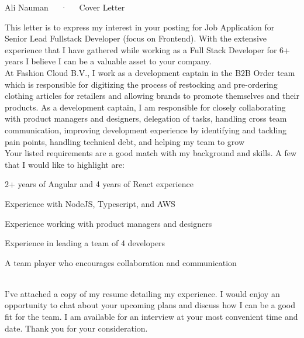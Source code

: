 \documentclass[11pt, a4paper]{awesome-cv}
\begin{document}
\makecvheader[L]

\makecvfooter
  {}
  {Ali Nauman~~~·~~~Cover Letter}
  {}

\makelettertitle

\begin{cvletter}


This letter is to express my interest in your posting for Job Application for Senior Lead Fullstack Developer (focus on Frontend). With the extensive experience that I have gathered while working as a Full Stack Developer for 6+ years I believe I can be a valuable asset to your company.\\

At Fashion Cloud B.V., I work as a development captain in the B2B Order team which is responsible for digitizing the process of restocking and pre-ordering clothing articles for retailers and allowing brands to promote themselves and their products. As a development captain, I am responsible for closely collaborating with product managers and designers, delegation of tasks, handling cross team communication, improving development experience by identifying and tackling pain points, handling technical debt, and helping my team to grow\\

Your listed requirements are a good match with my background and skills. A few that I would like to highlight are:\\

\begin{cvitems}
\item{2+ years of Angular and 4 years of React experience}
\item{Experience with NodeJS, Typescript, and AWS}
\item{Experience working with product managers and designers}
\item {Experience in leading a team of 4 developers}
\item {A team player who encourages collaboration and communication}
\\\\
\end{cvitems}

I’ve attached a copy of my resume detailing my experience. I would enjoy an opportunity to chat about your upcoming plans and discuss how I can be a good fit for the team. I am available for an interview at your most convenient time and date. Thank you for your consideration.


\end{cvletter}


\makeletterclosing
\end{document}
